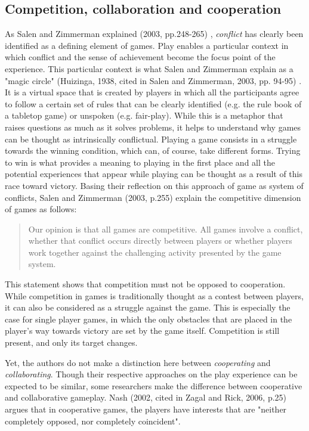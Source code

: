 \subsection{Competition, collaboration and cooperation}
As Salen and Zimmerman explained (2003, pp.248-265) \cite{book:rop}, \textit{conflict} has clearly been identified as a defining element of games. Play enables a particular context in which conflict and the sense of achievement become the focus point of the experience. This particular context is what Salen and Zimmerman explain as a "magic circle" (Huizinga, 1938, cited in Salen and Zimmerman, 2003, pp. 94-95) \cite{book:rop}. It is a virtual space that is created by players in which all the participants agree to follow a certain set of rules that can be clearly identified (e.g. the rule book of a tabletop game) or unspoken (e.g. fair-play). While this is a metaphor that raises questions as much as it solves problems, it helps to understand why games can be thought as intrinsically conflictual. 
Playing a game consists in a struggle towards the winning condition, which can, of course, take different forms. Trying to win is what provides a meaning to playing in the first place and all the potential experiences that appear while playing can be thought as a result of this race toward victory. Basing their reflection on this approach of game as system of conflicts, Salen and Zimmerman (2003, p.255) \cite{book:rop} explain the competitive dimension of games as follows:

\begin{quotation}
Our opinion is that all games are competitive. All games involve a conflict, whether that conflict occurs directly between players or whether players work together against the challenging activity presented by the game system.
\end{quotation}

This statement shows that competition must not be opposed to cooperation. While competition in games is traditionally  thought as a contest between players, it can also be considered as a struggle against the game. This is especially the case for single player games, in which the only obstacles that are placed in the player's way towards victory are set by the game itself. Competition is still present, and only its target changes. 


Yet, the authors do not make a distinction here between \textit{cooperating} and \textit{collaborating}. Though their respective approaches on the play experience can be expected to be similar, some researchers make the difference between cooperative and collaborative gameplay. 
Nash (2002, cited in Zagal and Rick, 2006, p.25)\cite{art:collab} argues that in cooperative games, the players have interests that are "neither completely opposed, nor completely coincident". 

